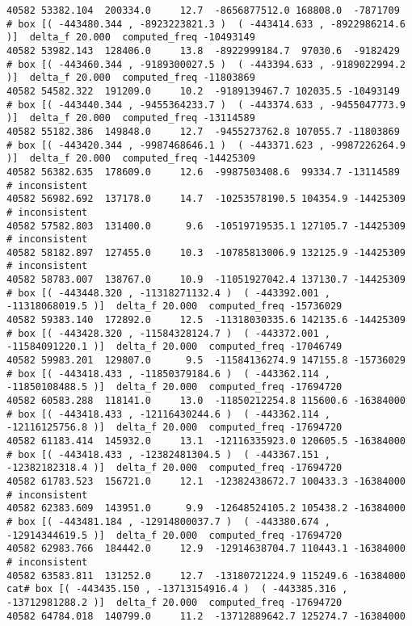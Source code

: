 \documentclass[a4paper]{report}
\begin{document}
\begin{enumerate}
\begin{lstlisting}
40582 53382.104  200334.0     12.7  -8656877512.0 168808.0  -7871709
# box [( -443480.344 , -8923223821.3 )  ( -443414.633 , -8922986214.6 )]  delta_f 20.000  computed_freq -10493149
40582 53982.143  128406.0     13.8  -8922999184.7  97030.6  -9182429
# box [( -443460.344 , -9189300027.5 )  ( -443394.633 , -9189022994.2 )]  delta_f 20.000  computed_freq -11803869
40582 54582.322  191209.0     10.2  -9189139467.7 102035.5 -10493149
# box [( -443440.344 , -9455364233.7 )  ( -443374.633 , -9455047773.9 )]  delta_f 20.000  computed_freq -13114589
40582 55182.386  149848.0     12.7  -9455273762.8 107055.7 -11803869
# box [( -443420.344 , -9987468646.1 )  ( -443371.623 , -9987226264.9 )]  delta_f 20.000  computed_freq -14425309
40582 56382.635  178609.0     12.6  -9987503408.6  99334.7 -13114589
# inconsistent
40582 56982.692  137178.0     14.7  -10253578190.5 104354.9 -14425309
# inconsistent
40582 57582.803  131400.0      9.6  -10519719535.1 127105.7 -14425309
# inconsistent
40582 58182.897  127455.0     10.3  -10785813006.9 132125.9 -14425309
# inconsistent
40582 58783.007  138767.0     10.9  -11051927042.4 137130.7 -14425309
# box [( -443448.320 , -11318271132.4 )  ( -443392.001 , -11318068019.5 )]  delta_f 20.000  computed_freq -15736029
40582 59383.140  172892.0     12.5  -11318030335.6 142135.6 -14425309
# box [( -443428.320 , -11584328124.7 )  ( -443372.001 , -11584091220.1 )]  delta_f 20.000  computed_freq -17046749
40582 59983.201  129807.0      9.5  -11584136274.9 147155.8 -15736029
# box [( -443418.433 , -11850379184.6 )  ( -443362.114 , -11850108488.5 )]  delta_f 20.000  computed_freq -17694720
40582 60583.288  118141.0     13.0  -11850212254.8 115600.6 -16384000
# box [( -443418.433 , -12116430244.6 )  ( -443362.114 , -12116125756.8 )]  delta_f 20.000  computed_freq -17694720
40582 61183.414  145932.0     13.1  -12116335923.0 120605.5 -16384000
# box [( -443418.433 , -12382481304.5 )  ( -443367.151 , -12382182318.4 )]  delta_f 20.000  computed_freq -17694720
40582 61783.523  156721.0     12.1  -12382438672.7 100433.3 -16384000
# inconsistent
40582 62383.609  143951.0      9.9  -12648524105.2 105438.2 -16384000
# box [( -443481.184 , -12914800037.7 )  ( -443380.674 , -12914344619.5 )]  delta_f 20.000  computed_freq -17694720
40582 62983.766  184442.0     12.9  -12914638704.7 110443.1 -16384000
# inconsistent
40582 63583.811  131252.0     12.7  -13180721224.9 115249.6 -16384000
cat# box [( -443435.150 , -13713154916.4 )  ( -443385.316 , -13712981288.2 )]  delta_f 20.000  computed_freq -17694720
40582 64784.018  140799.0     11.2  -13712889642.7 125274.7 -16384000

\end{lstlisting}
\end{enumerate}
\end{document}
